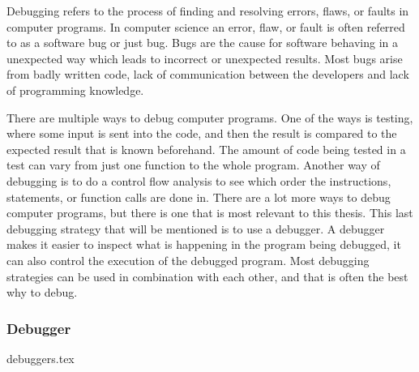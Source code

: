  

Debugging refers to the process of finding and resolving errors, flaws, or faults in computer programs.
In computer science an error, flaw, or fault is often referred to as a software bug or just bug.
Bugs are the cause for software behaving in a unexpected way which leads to incorrect or unexpected results.
Most bugs arise from badly written code, lack of communication between the developers and lack of programming knowledge.


There are multiple ways to debug computer programs.
One of the ways is testing, where some input is sent into the code, and then the result is compared to the expected result that is known beforehand.
The amount of code being tested in a test can vary from just one function to the whole program.
Another way of debugging is to do a control flow analysis to see which order the instructions, statements, or function calls are done in.
There are a lot more ways to debug computer programs, but there is one that is most relevant to this thesis.
This last debugging strategy that will be mentioned is to use a debugger.
A debugger makes it easier to inspect what is happening in the program being debugged, it can also control the execution of the debugged program.
Most debugging strategies can be used in combination with each other, and that is often the best why to debug.



\subsubsection{Debugger}
{debuggers.tex}

